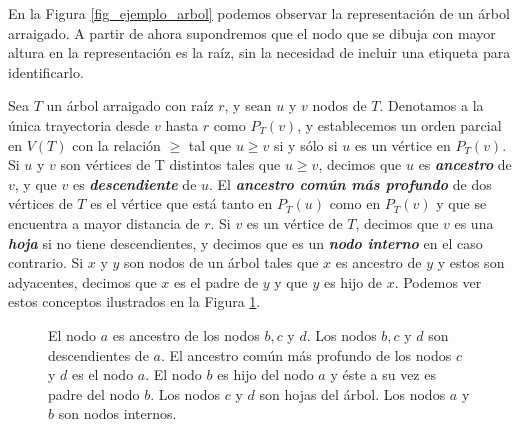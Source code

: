 En la Figura \ref{fig_ejemplo_arbol} podemos observar la representación de un árbol arraigado. A partir de ahora supondremos que el nodo que se dibuja con mayor altura en la representación es la raíz, sin la necesidad de incluir una etiqueta para identificarlo.

Sea $T$ un árbol arraigado con raíz $r$, y sean $u$ y $v$ nodos de $T$. Denotamos a la única trayectoria desde $v$ hasta $r$ como $P_T(v)$, y establecemos un orden parcial en $V(T)$ con la relación $\geq$ tal que $u \geq v$ si y sólo si $u$ es un vértice en $P_T(v)$. Si $u$ y $v$ son vértices de T distintos tales que $u \geq v$, decimos que $u$ es \textbf{\emph{ancestro}} de $v$, y que $v$ es \textbf{\emph{descendiente}} de $u$. El \textbf{\emph{ancestro común más profundo}} de dos vértices de $T$ es el vértice que está tanto en $P_T(u)$ como en $P_T(v)$ y que se encuentra a mayor distancia de $r$. Si $v$ es un vértice de $T$, decimos que $v$ es una \textbf{\emph{hoja}} si no tiene descendientes, y decimos que es un \textbf{\emph{nodo interno}} en el caso contrario. Si $x$ y $y$ son nodos de un árbol tales que $x$ es ancestro de $y$ y estos son adyacentes, decimos que $x$ es el padre de $y$ y que $y$ es hijo de $x$. Podemos ver estos conceptos ilustrados en la Figura \ref{fig_ejemplo_arbol_2}.

\begin{figure}[!htbp]
\centering
\begin{subfigure}{\textwidth}
\centering
{}
\end{subfigure}
\caption{El nodo $a$ es ancestro de los nodos $b,c $ y $d$. Los nodos $b,c $ y $d$ son descendientes de $a$. El ancestro común más profundo de los nodos $c$ y $d$ es el nodo $a$. El nodo $b$ es hijo del nodo $a$ y éste a su vez es padre del nodo $b$. Los nodos $c$ y $d$ son hojas del árbol. Los nodos $a$ y $b$ son nodos internos.}
\label{fig_ejemplo_arbol_2}
\end{figure}


